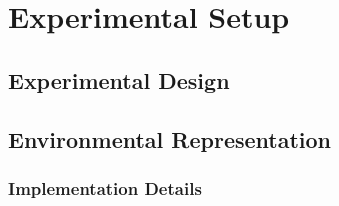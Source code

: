 
\chapter{Experimental Setup}


\section{ Experimental Design }


\section{ Environmental Representation}

\subsection{ Implementation Details }
